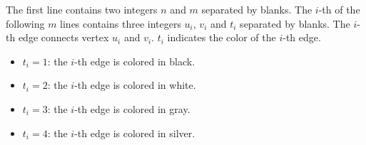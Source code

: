 The first line contains two integers $n$ and $m$ separated by blanks.
The $i$-th of the following $m$ lines contains three integers $u_i$, $v_i$
and $t_i$ separated by blanks.
The $i$-th edge connects vertex $u_i$ and $v_i$.
$t_i$ indicates the color of the $i$-th edge. 
\begin{itemize}
\tightlist
\item $t_i=1$: the $i$-th edge is colored in black.
\item $t_i=2$: the $i$-th edge is colored in white.
\item $t_i=3$: the $i$-th edge is colored in gray.
\item $t_i=4$: the $i$-th edge is colored in silver.
\end{itemize}

